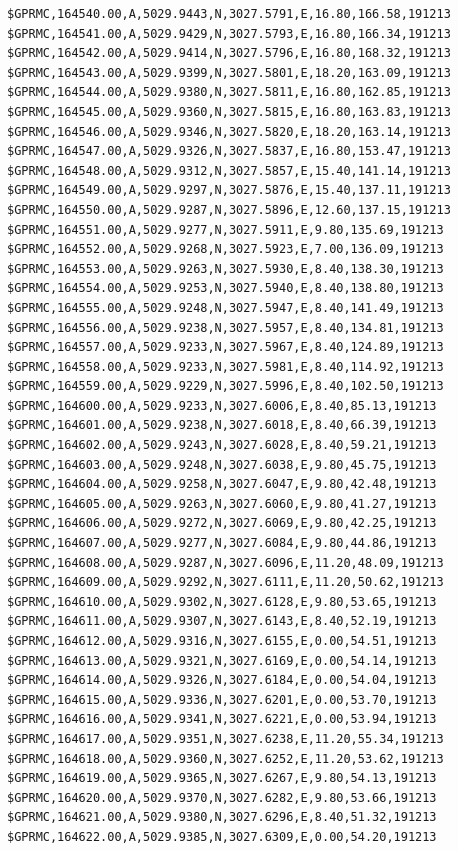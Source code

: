 \documentclass[simple,a4paper,14pt,ukrainian,utf8]{eskdtext}
\begin{document}
\begin{appendices}
\begin{small}
\begin{lstlisting}
$GPRMC,164540.00,A,5029.9443,N,3027.5791,E,16.80,166.58,191213
$GPRMC,164541.00,A,5029.9429,N,3027.5793,E,16.80,166.34,191213
$GPRMC,164542.00,A,5029.9414,N,3027.5796,E,16.80,168.32,191213
$GPRMC,164543.00,A,5029.9399,N,3027.5801,E,18.20,163.09,191213
$GPRMC,164544.00,A,5029.9380,N,3027.5811,E,16.80,162.85,191213
$GPRMC,164545.00,A,5029.9360,N,3027.5815,E,16.80,163.83,191213
$GPRMC,164546.00,A,5029.9346,N,3027.5820,E,18.20,163.14,191213
$GPRMC,164547.00,A,5029.9326,N,3027.5837,E,16.80,153.47,191213
$GPRMC,164548.00,A,5029.9312,N,3027.5857,E,15.40,141.14,191213
$GPRMC,164549.00,A,5029.9297,N,3027.5876,E,15.40,137.11,191213
$GPRMC,164550.00,A,5029.9287,N,3027.5896,E,12.60,137.15,191213
$GPRMC,164551.00,A,5029.9277,N,3027.5911,E,9.80,135.69,191213
$GPRMC,164552.00,A,5029.9268,N,3027.5923,E,7.00,136.09,191213
$GPRMC,164553.00,A,5029.9263,N,3027.5930,E,8.40,138.30,191213
$GPRMC,164554.00,A,5029.9253,N,3027.5940,E,8.40,138.80,191213
$GPRMC,164555.00,A,5029.9248,N,3027.5947,E,8.40,141.49,191213
$GPRMC,164556.00,A,5029.9238,N,3027.5957,E,8.40,134.81,191213
$GPRMC,164557.00,A,5029.9233,N,3027.5967,E,8.40,124.89,191213
$GPRMC,164558.00,A,5029.9233,N,3027.5981,E,8.40,114.92,191213
$GPRMC,164559.00,A,5029.9229,N,3027.5996,E,8.40,102.50,191213
$GPRMC,164600.00,A,5029.9233,N,3027.6006,E,8.40,85.13,191213
$GPRMC,164601.00,A,5029.9238,N,3027.6018,E,8.40,66.39,191213
$GPRMC,164602.00,A,5029.9243,N,3027.6028,E,8.40,59.21,191213
$GPRMC,164603.00,A,5029.9248,N,3027.6038,E,9.80,45.75,191213
$GPRMC,164604.00,A,5029.9258,N,3027.6047,E,9.80,42.48,191213
$GPRMC,164605.00,A,5029.9263,N,3027.6060,E,9.80,41.27,191213
$GPRMC,164606.00,A,5029.9272,N,3027.6069,E,9.80,42.25,191213
$GPRMC,164607.00,A,5029.9277,N,3027.6084,E,9.80,44.86,191213
$GPRMC,164608.00,A,5029.9287,N,3027.6096,E,11.20,48.09,191213
$GPRMC,164609.00,A,5029.9292,N,3027.6111,E,11.20,50.62,191213
$GPRMC,164610.00,A,5029.9302,N,3027.6128,E,9.80,53.65,191213
$GPRMC,164611.00,A,5029.9307,N,3027.6143,E,8.40,52.19,191213
$GPRMC,164612.00,A,5029.9316,N,3027.6155,E,0.00,54.51,191213
$GPRMC,164613.00,A,5029.9321,N,3027.6169,E,0.00,54.14,191213
$GPRMC,164614.00,A,5029.9326,N,3027.6184,E,0.00,54.04,191213
$GPRMC,164615.00,A,5029.9336,N,3027.6201,E,0.00,53.70,191213
$GPRMC,164616.00,A,5029.9341,N,3027.6221,E,0.00,53.94,191213
$GPRMC,164617.00,A,5029.9351,N,3027.6238,E,11.20,55.34,191213
$GPRMC,164618.00,A,5029.9360,N,3027.6252,E,11.20,53.62,191213
$GPRMC,164619.00,A,5029.9365,N,3027.6267,E,9.80,54.13,191213
$GPRMC,164620.00,A,5029.9370,N,3027.6282,E,9.80,53.66,191213
$GPRMC,164621.00,A,5029.9380,N,3027.6296,E,8.40,51.32,191213
$GPRMC,164622.00,A,5029.9385,N,3027.6309,E,0.00,54.20,191213

\end{lstlisting}
\end{small}
\end{appendices}
\end{document}
